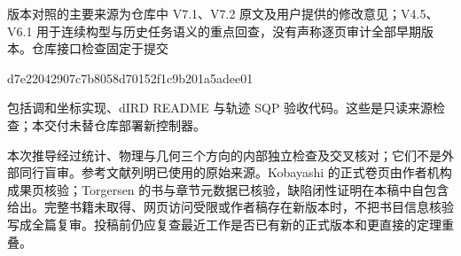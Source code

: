 \documentclass[UTF8,fontset=fandol,zihao=5,a4paper]{ctexart}
\theoremstyle{definition}
\theoremstyle{remark}\newtheorem{remark}[theorem]{说明}
\numberwithin{equation}{section}
\begin{document}
版本对照的主要来源为仓库中 V7.1、V7.2 原文及用户提供的修改意见；V4.5、V6.1 用于连续构型与历史任务语义的重点回查，没有声称逐页审计全部早期版本。仓库接口检查固定于提交
\begin{center}\small\ttfamily
d7e22042907c7b8058d70152f1c9b201a5adee01
\end{center}
包括调和坐标实现、dIRD README 与轨迹 SQP 验收代码\cite{realus}。这些是只读来源检查；本交付未替仓库部署新控制器。

本次推导经过统计、物理与几何三个方向的内部独立检查及交叉核对；它们不是外部同行盲审。参考文献列明已使用的原始来源。Kobayashi 的正式卷页由作者机构成果页核验；Torgersen 的书与章节元数据已核验，缺陷闭性证明在本稿中自包含给出。完整书籍未取得、网页访问受限或作者稿存在新版本时，不把书目信息核验写成全篇复审。投稿前仍应复查最近工作是否已有新的正式版本和更直接的定理重叠。
\end{document}
